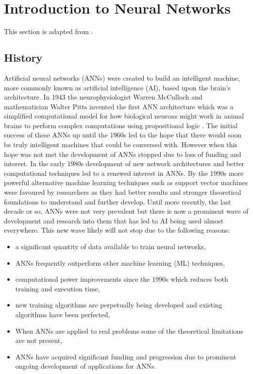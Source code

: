 \documentclass[\main/thesis.tex]{subfiles}
\begin{document}
\section{Introduction to Neural Networks}
This section is adapted from \textcite{Geron}.
\subsection{History}
Artificial neural networks (ANNs) were created to build an intelligent machine, more commonly known as artificial intelligence (AI), based upon the brain's architecture. In 1943 the neurophysiologist Warren McCulloch and mathematician Walter Pitts invented the first ANN architecture which was a simplified computational model for how biological neurons might work in animal brains to perform complex computations using propositional logic \parencite{McCulloch}. The initial success of these ANNs up until the 1960s led to 
the hope that there would soon be truly intelligent machines that could be conversed with. However when this hope was not met the development of ANNs stopped due to loss of funding and interest. In the early 1980s development of new network architectures and better computational techniques led to a renewed interest in ANNs. By the 1990s more powerful alternative machine learning techniques such as support vector machines were favoured by researchers as they had better results and stronger theoretical foundations to understand and further develop. Until more recently, the last decade or so, ANNs were not very prevalent but there is now a prominent wave of development and research into them that has led to AI being used almost everywhere. This new wave likely will not stop due to the following reasons:
\begin{itemize}
	\item a significant quantity of data available to train neural networks,
	\item ANNs frequently outperform other machine learning (ML) techniques,
	\item computational power improvements since the 1990s which reduces both training and execution time,
	\item new training algorithms are perpetually being developed and existing algorithms have been perfected,
	\item When ANNs are applied to real problems some of the theoretical limitations are not present,
	\item ANNs have acquired significant funding and progression due to prominent ongoing development of applications for ANNs.
\end{itemize}
\end{document}
